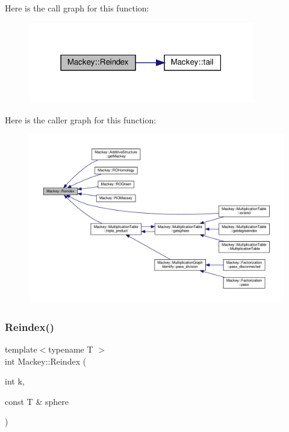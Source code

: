 Here is the call graph for this function\+:\nopagebreak
\begin{figure}[H]
\begin{center}
\leavevmode
\includegraphics[width=279pt]{namespaceMackey_a7da73ade3ee83c4ffd614e79242d7c04_cgraph}
\end{center}
\end{figure}
Here is the caller graph for this function\+:\nopagebreak
\begin{figure}[H]
\begin{center}
\leavevmode
\includegraphics[width=350pt]{namespaceMackey_a7da73ade3ee83c4ffd614e79242d7c04_icgraph}
\end{center}
\end{figure}
\mbox{\label{namespaceMackey_acb84c147d9ee39eac2883a762e3710dd}} 
\subsubsection{\texorpdfstring{Reindex()}{Reindex()}\hspace{0.1cm}{\footnotesize\ttfamily [2/2]}}
{\footnotesize\ttfamily template$<$typename T $>$ \\
int Mackey\+::\+Reindex (\begin{DoxyParamCaption}\item[{int}]{k,  }\item[{const T \&}]{sphere }\end{DoxyParamCaption})\hspace{0.3cm}{\ttfamily [inline]}}



